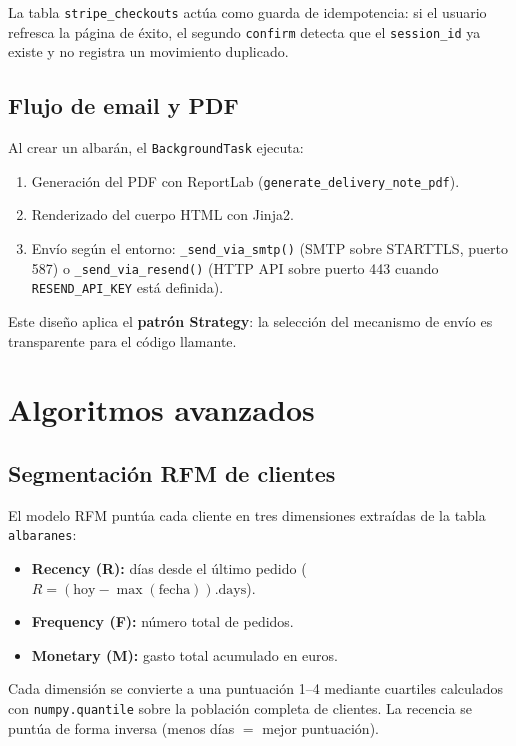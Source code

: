 \documentclass[12pt,twoside,titlepage]{report}
\begin{document}
La tabla \texttt{stripe\_checkouts} actúa como guarda de idempotencia: si el usuario refresca la página de éxito, el segundo \texttt{confirm} detecta que el \texttt{session\_id} ya existe y no registra un movimiento duplicado.

\subsection{Flujo de email y PDF}

Al crear un albarán, el \texttt{BackgroundTask} ejecuta:
\begin{enumerate}[nosep]
  \item Generación del PDF con ReportLab (\texttt{generate\_delivery\_note\_pdf}).
  \item Renderizado del cuerpo HTML con Jinja2.
  \item Envío según el entorno: \texttt{\_send\_via\_smtp()} (SMTP sobre STARTTLS, puerto 587) o \texttt{\_send\_via\_resend()} (HTTP API sobre puerto 443 cuando \texttt{RESEND\_API\_KEY} está definida).
\end{enumerate}

Este diseño aplica el \textbf{patrón Strategy}: la selección del mecanismo de envío es transparente para el código llamante.


\section{Algoritmos avanzados}

\subsection{Segmentación RFM de clientes}

El modelo RFM \cite{hughes1994,rfm_review} puntúa cada cliente en tres dimensiones extraídas de la tabla \texttt{albaranes}:

\begin{itemize}[nosep]
  \item \textbf{Recency (R):} días desde el último pedido ($R = (\text{hoy} - \max(\text{fecha})).\text{days}$).
  \item \textbf{Frequency (F):} número total de pedidos.
  \item \textbf{Monetary (M):} gasto total acumulado en euros.
\end{itemize}

Cada dimensión se convierte a una puntuación 1--4 mediante cuartiles calculados con \texttt{numpy.quantile} sobre la población completa de clientes. La recencia se puntúa de forma inversa (menos días $=$ mejor puntuación).
\end{document}
